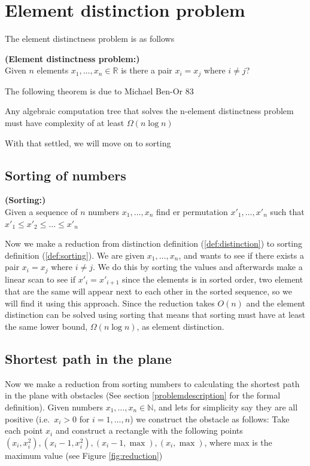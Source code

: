 \section{Element distinction problem}

The element distinctness problem is as follows
\begin{mydef} \textbf{(Element distinctness problem:)} \\
	\label{def:distinction}
	Given $n$ elements $x_1,\dots,x_n\in \mathbb{R}$ is there a pair $x_i=x_j$
	where $i\neq j$?
\end{mydef}

The following theorem is due to Michael Ben-Or 83\cite{DBLP:conf/stoc/Ben-Or83}

\begin{theorem}
	\label{thm:distinction_lower}
Any algebraic computation tree that solves the n-element distinctness problem
must have complexity of at least $\Omega{(n \log n)}$
\end{theorem}

With that settled, we will move on to sorting

\subsection{Sorting of numbers}

\begin{mydef}\textbf{(Sorting:)} \label{def:sorting} \\
    Given a sequence of $n$ numbers $x_1,\dots,x_n$ find er permutation
	$x'_1,\dots,x'_n$ such that  $x'_1\leq x'_2 \leq\dots\leq x'_n$
\end{mydef}

Now we make a reduction from distinction definition (\ref{def:distinction}) to
sorting definition (\ref{def:sorting}). We are given $x_1,\dots, x_n$, and wants to
see if there exists a pair $x_i=x_j$ where $i\neq j$. We do this by sorting the
values and afterwards make a linear scan to see if $x'_i = x'_{i+1}$ since the 
elements is in sorted order, two element that are the same will appear next to
each other in the sorted sequence, so we will find it using this approach.
Since the reduction takes $O(n)$ and the element distinction can be solved
using sorting that means that sorting must have at least the same lower bound,
$\Omega(n\log n)$, as element distinction. 

\subsection{Shortest path in the plane}
Now we make a reduction from sorting numbers to calculating the shortest path
in the plane with obstacles (See section \ref{problemdescription} for the
formal definition).
Given numbers $x_1,\dots,x_n\in \mathbb{N}$, and lets for simplicity say they are all positive
(i.e.\ $x_i>0$ for $i=1,\dots,n$) we construct the obstacle as follows: Take each
point $x_i$ and construct a rectangle with the following points
$(x_i,x_i^2),(x_i-1,x_i^2),(x_i-1,\max), (x_i,\max)$, where max is the maximum
value (see Figure \ref{fig:reduction})

